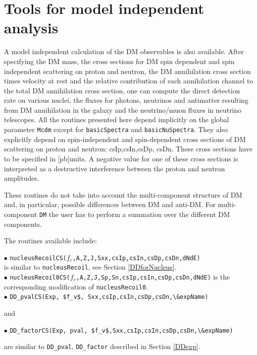 \documentclass[12pt,a4paper]{article}
\begin{document}
 
\section{Tools for model independent analysis}
\label{mdlIndep}

A model independent calculation of the DM observables is also available.
After specifying the DM mass, the cross sections for DM  spin dependent and  spin independent scattering on proton and neutron, the DM annihilation cross section times velocity at rest and the relative contribution of  each annihilation channel to the total DM annihilation cross section, one can compute the direct detection rate on   various nuclei, the fluxes for photons, neutrinos and antimatter resulting from DM annihilation in the galaxy and the neutrino/muon fluxes in neutrino telescopes.  
All the routines presented here 
depend implicitly on the  global parameter {\tt Mcdm} except for {\tt basicSpectra} and {\tt basicNuSpectra}.
They also explicitly depend on spin-independent and spin-dependent cross sections of DM scattering
on proton and neutron: csIp,csIn,csDp, csDn. These cross sections have to be specified in
[pb]units. A negative value for one of these cross sections is interpreted as a destructive 
interference between the proton and neutron amplitudes. 

These routines do not   take into account the multi-component structure of DM and, in particular, possible   
differences between DM and anti-DM.    For multi-component {\tt DM} the user has to perform a summation over the different DM components. 

The routines available include:
   
\noindent
$\bullet$ \verb|nucleusRecoilCS(|$f_v$\verb|,A,Z,J,Sxx,csIp,csIn,csDp,csDn,dNdE)|\\
is similar to \verb|nucleusRecoil|, see Section \ref{DDforNucleus}.  \\
\noindent
$\bullet$ \verb|nucleusRecoil0CS(|$f_v$\verb|,A,Z,J,Sp,Sn,csIp,csIn,csDp,csDn,dNdE)|
is the corresponding modification of \verb|nucleusRecoil0|.\\

\noindent
$\bullet$ \verb|DD_pvalCS(Exp, $f_v$, Sxx,csIp,csIn,csDp,csDn,\&expName)|

\noindent
and

\noindent
$\bullet$ \verb|DD_factorCS(Exp, pval, $f_v$,Sxx,csIp,csIn,csDp,csDn,\&expName)|

\noindent
are similar to  \verb|DD_pval|, \verb|DD_factor| described in Section \ref{DDexp}.
\end{document}
